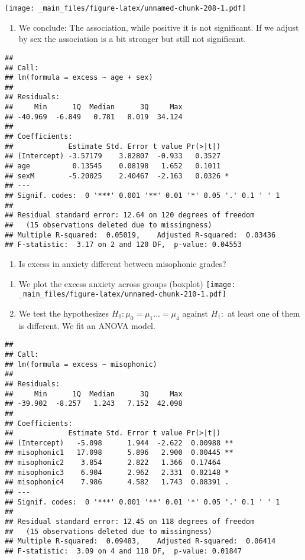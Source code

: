\documentclass[
]{book}
\providecommand{\tightlist}{%
  \setlength{\itemsep}{0pt}\setlength{\parskip}{0pt}}
\begin{document}
\texttt{[image: \_main\_files/figure-latex/unnamed-chunk-208-1.pdf]}

\begin{enumerate}
\def\labelenumi{\alph{enumi}.}
\setcounter{enumi}{2}
\tightlist
\item
  We conclude: The association, while positive it is not significant. If we adjust by sex the association is a bit stronger but still not significant.
\end{enumerate}

\begin{verbatim}
## 
## Call:
## lm(formula = excess ~ age + sex)
## 
## Residuals:
##     Min      1Q  Median      3Q     Max 
## -40.969  -6.849   0.781   8.019  34.124 
## 
## Coefficients:
##             Estimate Std. Error t value Pr(>|t|)  
## (Intercept) -3.57179    3.82807  -0.933   0.3527  
## age          0.13545    0.08198   1.652   0.1011  
## sexM        -5.20025    2.40467  -2.163   0.0326 *
## ---
## Signif. codes:  0 '***' 0.001 '**' 0.01 '*' 0.05 '.' 0.1 ' ' 1
## 
## Residual standard error: 12.64 on 120 degrees of freedom
##   (15 observations deleted due to missingness)
## Multiple R-squared:  0.05019,    Adjusted R-squared:  0.03436 
## F-statistic:  3.17 on 2 and 120 DF,  p-value: 0.04553
\end{verbatim}

\begin{enumerate}
\def\labelenumi{\arabic{enumi}.}
\setcounter{enumi}{4}
\tightlist
\item
  Is excess in anxiety different between misophonic grades?
\end{enumerate}

\begin{enumerate}
\def\labelenumi{\alph{enumi}.}
\item
  We plot the excess anxiety across groups (boxplot)
  \texttt{[image: \_main\_files/figure-latex/unnamed-chunk-210-1.pdf]}
\item
  We test the hypothesizes \(H_0: \mu_{0}=\mu_{1} ... =\mu_{4}\) against \(H_1:\) at least one of them is different. We fit an ANOVA model.
\end{enumerate}

\begin{verbatim}
## 
## Call:
## lm(formula = excess ~ misophonic)
## 
## Residuals:
##     Min      1Q  Median      3Q     Max 
## -39.902  -8.257   1.243   7.152  42.098 
## 
## Coefficients:
##             Estimate Std. Error t value Pr(>|t|)   
## (Intercept)   -5.098      1.944  -2.622  0.00988 **
## misophonic1   17.098      5.896   2.900  0.00445 **
## misophonic2    3.854      2.822   1.366  0.17464   
## misophonic3    6.904      2.962   2.331  0.02148 * 
## misophonic4    7.986      4.582   1.743  0.08391 . 
## ---
## Signif. codes:  0 '***' 0.001 '**' 0.01 '*' 0.05 '.' 0.1 ' ' 1
## 
## Residual standard error: 12.45 on 118 degrees of freedom
##   (15 observations deleted due to missingness)
## Multiple R-squared:  0.09483,    Adjusted R-squared:  0.06414 
## F-statistic:  3.09 on 4 and 118 DF,  p-value: 0.01847
\end{verbatim}
\end{document}
